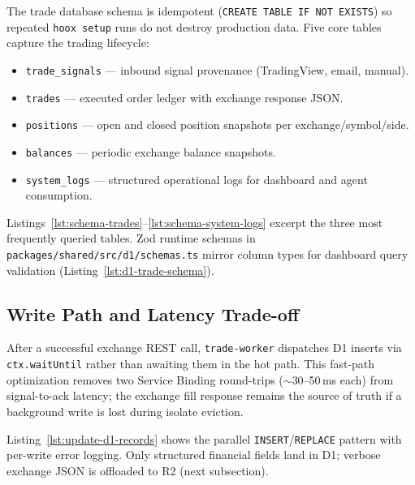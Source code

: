 The trade database schema is idempotent (\texttt{CREATE TABLE IF NOT EXISTS}) so repeated \texttt{hoox setup} runs do not destroy production data. Five core tables capture the trading lifecycle:

\begin{itemize}
  \item \texttt{trade\_signals} --- inbound signal provenance (TradingView, email, manual).
  \item \texttt{trades} --- executed order ledger with exchange response JSON.
  \item \texttt{positions} --- open and closed position snapshots per exchange/symbol/side.
  \item \texttt{balances} --- periodic exchange balance snapshots.
  \item \texttt{system\_logs} --- structured operational logs for dashboard and agent consumption.
\end{itemize}

Listings~\ref{lst:schema-trades}--\ref{lst:schema-system-logs} excerpt the three most frequently queried tables. Zod runtime schemas in \texttt{packages/shared/src/d1/schemas.ts} mirror column types for dashboard query validation (Listing~\ref{lst:d1-trade-schema}).


\subsection{Write Path and Latency Trade-off}

After a successful exchange REST call, \texttt{trade-worker} dispatches D1 inserts via \texttt{ctx.waitUntil} rather than awaiting them in the hot path. This fast-path optimization removes two Service Binding round-trips (${\sim}$30--50\,ms each) from signal-to-ack latency; the exchange fill response remains the source of truth if a background write is lost during isolate eviction.

Listing~\ref{lst:update-d1-records} shows the parallel \texttt{INSERT}/\texttt{REPLACE} pattern with per-write error logging. Only structured financial fields land in D1; verbose exchange JSON is offloaded to R2 (next subsection).

